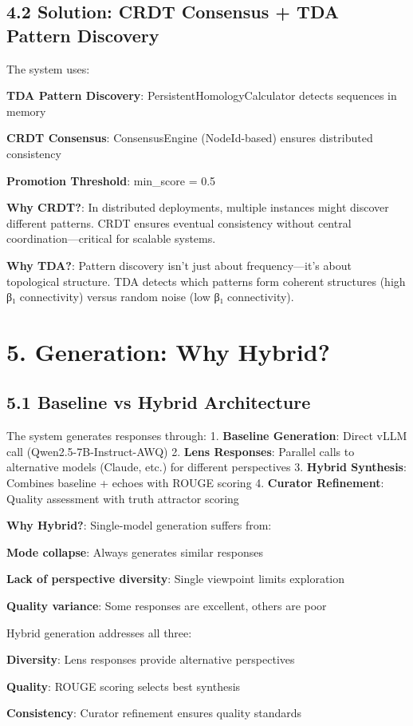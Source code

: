 \documentclass[11pt,a4paper]{article}
\begin{document}
\subsection{4.2 Solution: CRDT Consensus + TDA Pattern Discovery}

The system uses:
\item \textbf{TDA Pattern Discovery}: PersistentHomologyCalculator detects sequences in memory
\item \textbf{CRDT Consensus}: ConsensusEngine (NodeId-based) ensures distributed consistency
\item \textbf{Promotion Threshold}: min_score = 0.5

\textbf{Why CRDT?}: In distributed deployments, multiple instances might discover different patterns. CRDT ensures eventual consistency without central coordination—critical for scalable systems.

\textbf{Why TDA?}: Pattern discovery isn't just about frequency—it's about topological structure. TDA detects which patterns form coherent structures (high β₁ connectivity) versus random noise (low β₁ connectivity).

\section{5. Generation: Why Hybrid?}

\subsection{5.1 Baseline vs Hybrid Architecture}

The system generates responses through:
1. \textbf{Baseline Generation}: Direct vLLM call (Qwen2.5-7B-Instruct-AWQ)
2. \textbf{Lens Responses}: Parallel calls to alternative models (Claude, etc.) for different perspectives
3. \textbf{Hybrid Synthesis}: Combines baseline + echoes with ROUGE scoring
4. \textbf{Curator Refinement}: Quality assessment with truth attractor scoring

\textbf{Why Hybrid?}: Single-model generation suffers from:
\item \textbf{Mode collapse}: Always generates similar responses
\item \textbf{Lack of perspective diversity}: Single viewpoint limits exploration
\item \textbf{Quality variance}: Some responses are excellent, others are poor

Hybrid generation addresses all three:
\item \textbf{Diversity}: Lens responses provide alternative perspectives
\item \textbf{Quality}: ROUGE scoring selects best synthesis
\item \textbf{Consistency}: Curator refinement ensures quality standards
\end{document}
